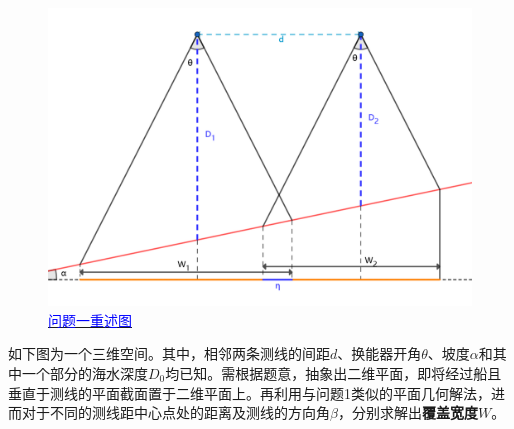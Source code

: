 \begin{figure}[h]
    \centering
    \includegraphics[scale=0.2]{res/img/问题一重述图.png}
    \caption{\href{https://www.geogebra.org/m/fza22fcy}{\textcolor{blue}{问题一重述图}}}
    \label{fig:问题一重述图}
\end{figure}


如下图为一个三维空间。其中，相邻两条测线的间距$d$、换能器开角$\theta$、坡度$\alpha$和其中一个部分的海水深度$D_0$均已知。需根据题意，抽象出二维平面，即将经过船且垂直于测线的平面截面置于二维平面上。再利用与问题1类似的平面几何解法，进而对于不同的测线距中心点处的距离及测线的方向角$\beta$，分别求解出\textbf{覆盖宽度}$W$。




